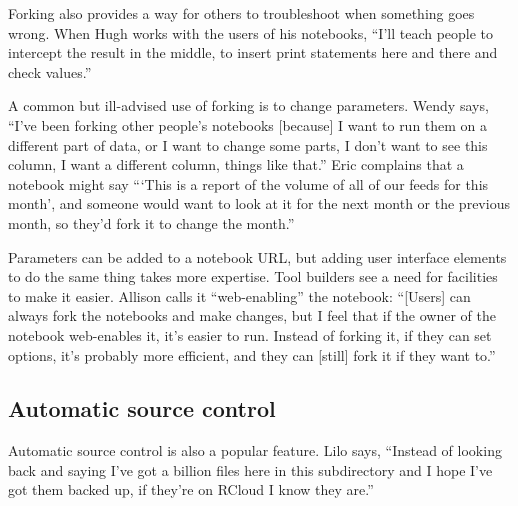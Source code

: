 Forking also provides a way for others to troubleshoot when something goes
wrong.  When Hugh works with the users of his notebooks, ``I'll teach people
to intercept the result in the middle, to insert print statements here and
there and check values.''



A common but ill-advised use of forking is to change
parameters. Wendy says, ``I've been forking other people's notebooks [because] I
want to run them on a different part of data, or I want to change some parts,
I don't want to see this column, I want a different column, things like
that.''  Eric complains that a notebook might say ```This is a report of
the volume of all of our feeds for this month', and someone would want to
look at it for the next month or the previous month, so they'd fork it to
change the month.''

Parameters can be added to a notebook URL, but adding user interface
elements to do the same thing takes more expertise. Tool builders see a
need for facilities to make it easier. Allison calls it ``web-enabling'' the
notebook: ``[Users] can always fork the notebooks and make changes, but I
feel that if the owner of the notebook web-enables it, it's easier to
run. Instead of forking it, if they can set options, it's probably more
efficient, and they can [still] fork it if they want to.''


\subsection{Automatic source control}

Automatic source control is also a popular feature. Lilo says, ``Instead of
looking back and saying I've got a billion files here in this subdirectory and I
hope I've got them backed up, if they're on RCloud I know they are.''

